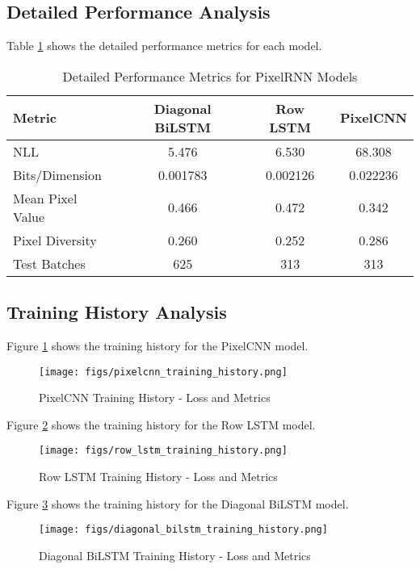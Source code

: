 \documentclass[norunningheads]{llncs}
\begin{document}
\subsection{Detailed Performance Analysis}

Table \ref{tab:detailed_metrics} shows the detailed performance metrics for each model.

\begin{table}[h]
\caption{Detailed Performance Metrics for PixelRNN Models}
\label{tab:detailed_metrics}
\centering
\begin{tabular}{@{}lccc@{}}
\toprule
Metric & Diagonal BiLSTM & Row LSTM & PixelCNN \\
\midrule
NLL & 5.476 & 6.530 & 68.308 \\
Bits/Dimension & 0.001783 & 0.002126 & 0.022236 \\
Mean Pixel Value & 0.466 & 0.472 & 0.342 \\
Pixel Diversity & 0.260 & 0.252 & 0.286 \\
Test Batches & 625 & 313 & 313 \\
\bottomrule
\end{tabular}
\end{table}

\subsection{Training History Analysis}

Figure \ref{fig:pixelcnn_training} shows the training history for the PixelCNN model.

\begin{figure}[h]
\centering
\texttt{[image: figs/pixelcnn\_training\_history.png]}
\caption{PixelCNN Training History - Loss and Metrics}
\label{fig:pixelcnn_training}
\end{figure}

Figure \ref{fig:row_lstm_training} shows the training history for the Row LSTM model.

\begin{figure}[h]
\centering
\texttt{[image: figs/row\_lstm\_training\_history.png]}
\caption{Row LSTM Training History - Loss and Metrics}
\label{fig:row_lstm_training}
\end{figure}

Figure \ref{fig:diagonal_bilstm_training} shows the training history for the Diagonal BiLSTM model.

\begin{figure}[h]
\centering
\texttt{[image: figs/diagonal\_bilstm\_training\_history.png]}
\caption{Diagonal BiLSTM Training History - Loss and Metrics}
\label{fig:diagonal_bilstm_training}
\end{figure}
\end{document}
